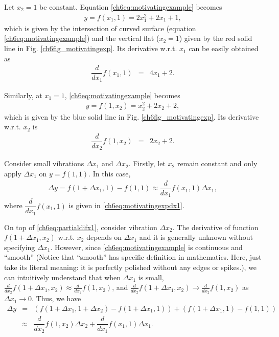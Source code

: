 Let $x_2=1$ be constant. Equation \eqref{ch6eq:motivatingexample} becomes
\begin{eqnarray}
	y = f(x_1, 1) = 2x_1^2 + 2x_1 + 1, \nonumber
\end{eqnarray}
which is given by the intersection of  curved surface (equation \eqref{ch6eq:motivatingexample}) and the vertical flat ($x_2=1$) given by the red solid line in Fig. \ref{ch6fig_motivatingexp}. Its derivative w.r.t. $x_1$ can be easily obtained as
\begin{eqnarray}
	\dfrac{d}{dx_1}f(x_1,1) &=& 4x_1 + 2. \label{ch6eq:motivatingexpdx1}
\end{eqnarray}

Similarly, at $x_1 = 1$, \eqref{ch6eq:motivatingexample} becomes
\begin{eqnarray}
	y = f(1, x_2) = x_2^2 + 2x_2 + 2, \nonumber
\end{eqnarray}
which is given by the blue solid line in Fig. \ref{ch6fig_motivatingexp}. Its derivative w.r.t. $x_2$ is
\begin{eqnarray}
	\dfrac{d}{dx_2}f(1,x_2) &=& 2x_2 + 2. \label{ch6eq:motivatingexpdx2}
\end{eqnarray}

Consider small vibrations $\Delta x_1$ and $\Delta x_2$. Firstly, let $x_2$ remain constant and only apply $\Delta x_1$ on $y = f(1,1)$. In this case,
\begin{eqnarray}
	\Delta y = f(1+\Delta x_1, 1) - f(1, 1) \approx \dfrac{d}{dx_1}f(x_1,1) \Delta x_1, \label{ch6eq:partialdifx1}
\end{eqnarray}
where $\dfrac{d}{dx_1}f(x_1,1)$ is given in \eqref{ch6eq:motivatingexpdx1}.

On top of \eqref{ch6eq:partialdifx1}, consider vibration $\Delta x_2$. The derivative of function $f(1+\Delta x_1, x_2)$ w.r.t. $x_2$ depends on $\Delta x_1$ and it is generally unknown without specifying $\Delta x_1$. However, since \eqref{ch6eq:motivatingexample} is continuous and ``smooth'' (Notice that ``smooth'' has specific definition in mathematics. Here, just take its literal meaning: it is perfectly polished without any edges or spikes.), we can intuitively understand that when $\Delta x_1$ is small, $\frac{d}{dx_2}f(1+\Delta x_1, x_2) \approx \frac{d}{dx_2}f(1, x_2)$, and $\frac{d}{dx_2}f(1+\Delta x_1, x_2) \rightarrow \frac{d}{dx_2}f(1, x_2)$ as $\Delta x_1 \rightarrow 0$. Thus, we have
\begin{eqnarray}
	\Delta y &=& \left(f(1+\Delta x_1, 1 + \Delta x_2) -  f(1+\Delta x_1, 1)\right) + \left(f(1+\Delta x_1, 1) - f(1, 1)\right) \nonumber \\
	&\approx& \dfrac{d}{dx_2}f(1,x_2) \Delta x_2 + \dfrac{d}{dx_1}f(x_1,1) \Delta x_1. \label{ch6eq:motivatingresult1}
\end{eqnarray}

